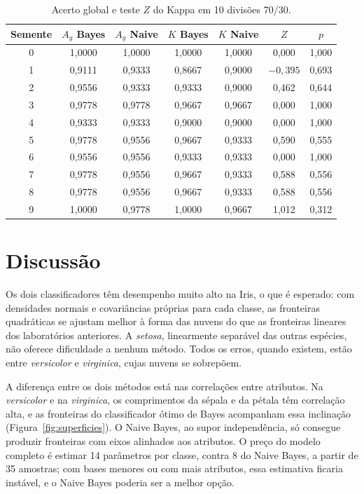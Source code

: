\documentclass[12pt,a4paper]{article}
\newcommand{\setosa}{\emph{setosa}}
\newcommand{\versicolor}{\emph{versicolor}}
\newcommand{\virginica}{\emph{virginica}}
\begin{document}
\begin{table}[H]
\centering
\caption{Acerto global e teste $Z$ do Kappa em 10 divisões 70/30.}
\label{tab:sementes}
\small
\begin{tabular}{ccccccc}
\toprule
Semente & $A_g$ Bayes & $A_g$ Naive & $K$ Bayes & $K$ Naive & $Z$ & $p$ \\
\midrule
0 & 1,0000 & 1,0000 & 1,0000 & 1,0000 & 0,000      & 1,000 \\
1 & 0,9111 & 0,9333 & 0,8667 & 0,9000 & $-0{,}395$ & 0,693 \\
2 & 0,9556 & 0,9333 & 0,9333 & 0,9000 & 0,462      & 0,644 \\
3 & 0,9778 & 0,9778 & 0,9667 & 0,9667 & 0,000      & 1,000 \\
4 & 0,9333 & 0,9333 & 0,9000 & 0,9000 & 0,000      & 1,000 \\
5 & 0,9778 & 0,9556 & 0,9667 & 0,9333 & 0,590      & 0,555 \\
6 & 0,9556 & 0,9556 & 0,9333 & 0,9333 & 0,000      & 1,000 \\
7 & 0,9778 & 0,9556 & 0,9667 & 0,9333 & 0,588      & 0,556 \\
8 & 0,9778 & 0,9556 & 0,9667 & 0,9333 & 0,588      & 0,556 \\
9 & 1,0000 & 0,9778 & 1,0000 & 0,9667 & 1,012      & 0,312 \\
\bottomrule
\end{tabular}
\end{table}

\section{Discussão}

Os dois classificadores têm desempenho muito alto na Iris, o que é esperado: com densidades normais e covariâncias próprias para cada classe, as fronteiras quadráticas se ajustam melhor à forma das nuvens do que as fronteiras lineares dos laboratórios anteriores. A \setosa{}, linearmente separável das outras espécies, não oferece dificuldade a nenhum método. Todos os erros, quando existem, estão entre \versicolor{} e \virginica{}, cujas nuvens se sobrepõem.

A diferença entre os dois métodos está nas correlações entre atributos. Na \versicolor{} e na \virginica{}, os comprimentos da sépala e da pétala têm correlação alta, e as fronteiras do classificador ótimo de Bayes acompanham essa inclinação (Figura~\ref{fig:superficies}). O Naive Bayes, ao supor independência, só consegue produzir fronteiras com eixos alinhados aos atributos. O preço do modelo completo é estimar 14 parâmetros por classe, contra 8 do Naive Bayes, a partir de 35 amostras; com bases menores ou com mais atributos, essa estimativa ficaria instável, e o Naive Bayes poderia ser a melhor opção.
\end{document}

